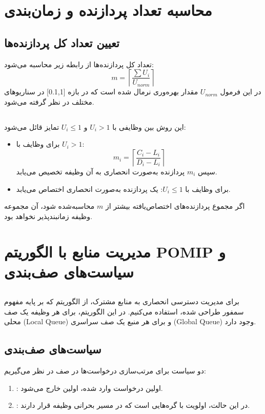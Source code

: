 \documentclass[12pt,a4paper]{report}
\begin{document}
\chapter{محاسبه تعداد پردازنده و زمان‌بندی}
\section{تعیین تعداد کل پردازنده‌ها}
تعداد کل پردازنده‌ها از رابطه زیر محاسبه می‌شود:
\[
m = \left\lceil \frac{\sum U_i}{U_{norm}} \right\rceil
\]
در این فرمول $U_{norm}$ مقدار بهره‌وری نرمال شده است که در بازه [0.1,1] در سناریوهای مختلف در نظر گرفته می‌شود.

\section{}
این روش بین وظایفی با $U_i > 1$ و $U_i \leq 1$ تمایز قائل می‌شود:
\begin{itemize}
\item برای وظایف با $U_i > 1$: 
\[
m_i = \left\lceil \frac{C_i - L_i}{D_i - L_i} \right\rceil
\]
سپس $m_i$ پردازنده به‌صورت انحصاری به آن وظیفه تخصیص می‌یابد.
\item برای وظایف با $U_i \leq 1$: یک پردازنده به‌صورت انحصاری اختصاص می‌یابد.
\end{itemize}

اگر مجموع پردازنده‌های اختصاص‌یافته بیشتر از $m$ محاسبه‌شده شود، آن مجموعه وظیفه زمانبندپذیر نخواهد بود.

\chapter{مدیریت منابع با الگوریتم POMIP و سیاست‌های صف‌بندی}
\section{}
برای مدیریت دسترسی انحصاری به منابع مشترک، از الگوریتم  که بر پایه مفهوم سمفور طراحی شده، استفاده می‌کنیم. در این الگوریتم، برای هر وظیفه یک صف محلی (Local Queue) و برای هر منبع یک صف سراسری (Global Queue) وجود دارد.

\section{سیاست‌های صف‌بندی}
دو سیاست برای مرتب‌سازی درخواست‌ها در صف در نظر می‌گیریم:
\begin{enumerate}
\item {}: اولین درخواست وارد شده، اولین خارج می‌شود.
\item {}: در این حالت، اولویت با گره‌هایی است که در مسیر بحرانی وظیفه قرار دارند.
\end{enumerate}
\end{document}
